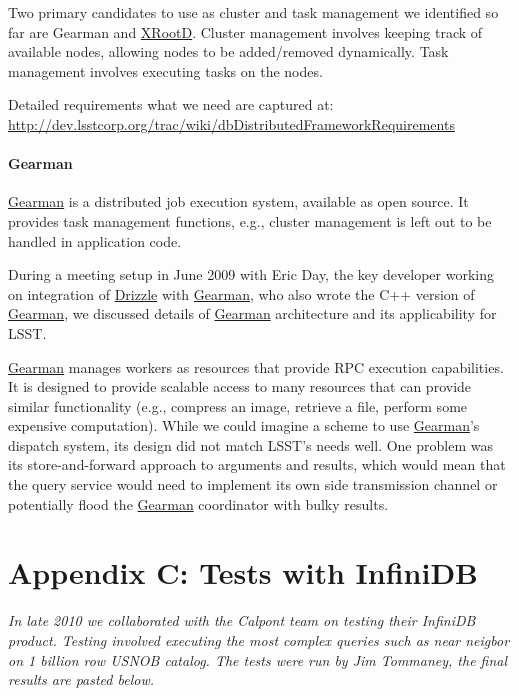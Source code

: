 \documentclass[DM,lsstdraft,toc]{lsstdoc}
\begin{document}
Two primary candidates to use as cluster and task management we
identified so far are Gearman and \href{http://xrootd.org}{XRootD}.
Cluster management involves keeping track of available nodes, allowing
nodes to be added/removed dynamically. Task management involves
executing tasks on the nodes.

Detailed requirements what we need are captured at:
\url{http://dev.lsstcorp.org/trac/wiki/dbDistributedFrameworkRequirements}

\paragraph{Gearman}\label{gearman}

\href{http://gearman.org/}{Gearman} is a distributed job execution
system, available as open source. It provides task management functions,
e.g., cluster management is left out to be handled in application code.

During a meeting setup in June 2009 with Eric Day, the key developer
working on integration of \href{http://drizzle.org/}{Drizzle} with
\href{http://gearman.org/}{Gearman}, who also wrote the C++ version of
\href{http://gearman.org/}{Gearman}, we discussed details of
\href{http://gearman.org/}{Gearman} architecture and its applicability
for LSST.

\href{http://gearman.org/}{Gearman} manages workers as resources that
provide RPC execution capabilities. It is designed to provide scalable
access to many resources that can provide similar functionality (e.g.,
compress an image, retrieve a file, perform some expensive computation).
While we could imagine a scheme to use
\href{http://gearman.org/}{Gearman}'s dispatch system, its design did
not match LSST's needs well. One problem was its store-and-forward
approach to arguments and results, which would mean that the query
service would need to implement its own side transmission channel or
potentially flood the \href{http://gearman.org/}{Gearman} coordinator
with bulky results.

\section{Appendix C: Tests with
InfiniDB}\label{appendix-c-tests-with-infinidb}

\emph{In late 2010 we collaborated with the Calpont team on testing
their InfiniDB product. Testing involved executing the most complex
queries such as near neigbor on 1 billion row USNOB catalog. The tests
were run by Jim Tommaney, the final results are pasted below.}
\end{document}
